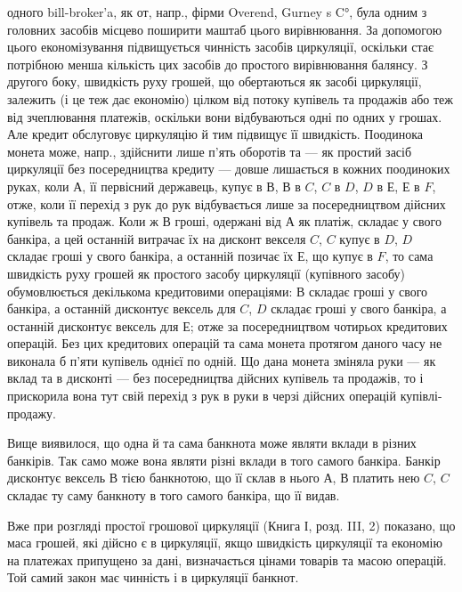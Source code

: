 \parcont{}  %
одного bill-broker’a, як от, напр., фірми Overend, Gurney s C°, була одним з головних
засобів місцево поширити маштаб цього вирівнювання. За допомогою
цього економізування підвищується чинність засобів циркуляції, оскільки стає
потрібною менша кількість цих засобів до простого вирівнювання балянсу.
З другого боку, швидкість руху грошей, що обертаються як засобі циркуляції, залежить
(і це теж дає економію) цілком від потоку купівель та продажів або теж
від зчеплювання платежів, оскільки вони відбуваються одні по одних у грошах.
Але кредит обслуговує циркуляцію й тим підвищує її швидкість. Поодинока монета
може, напр., здійснити лише п’ять оборотів та — як простий засіб циркуляції
без посередництва кредиту — довше лишається в кожних поодиноких руках,
коли $А$, її первісний державець, купує в $В$, $В$ в $C$, $C$ в $D$, $D$ в $Е$, $Е$ в $F$, отже,
коли її перехід з рук до рук відбувається лише за посередництвом дійсних купівель
та продаж. Коли ж $В$ гроші, одержані від $А$ як платіж, складає у свого
банкіра, а цей останній витрачає їх на дисконт векселя $C$, $C$ купує в $D$, $D$ складає
гроші у свого банкіра, а останній позичає їх $Е$, що купує в $F$, то сама
швидкість руху грошей як простого засобу циркуляції (купівного засобу) обумовлюється декількома
кредитовими операціями: $В$ складає гроші у свого банкіра,
а останній дисконтує вексель для $C$, $D$ складає гроші у свого банкіра, а останній
дисконтує вексель для $Е$; отже за посередництвом чотирьох кредитових операцій.
Без цих кредитових операцій та сама монета протягом даного часу не виконала
б п’яти купівель однієї по одній. Що дана монета зміняла руки — як вклад та
в дисконті — без посередництва дійсних купівель та продажів, то і прискорила
вона тут свій перехід з рук в руки в черзі дійсних операцій купівлі-продажу.

Вище виявилося, що одна й та сама банкнота може являти вклади в
різних банкірів. Так само може вона являти різні вклади в того самого банкіра.
Банкір дисконтує вексель $В$ тією банкнотою, що її склав в нього $А$, $В$ платить
нею $C$, $C$ складає ту саму банкноту в того самого банкіра, що її видав.

Вже при розгляді простої грошової циркуляції (Книга І, розд. III, 2) показано,
що маса грошей, які дійсно є в циркуляції, якщо швидкість циркуляції
та економію на платежах припущено за дані, визначається цінами товарів та
масою операцій. Той самий закон має чинність і в циркуляції банкнот.

